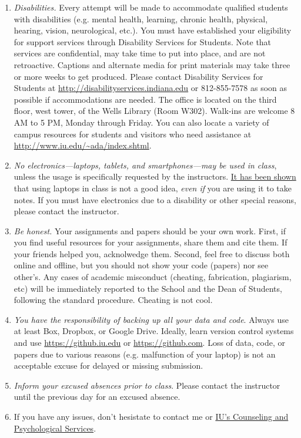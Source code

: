 \documentclass[11pt,article,oneside]{memoir}
\begin{document}
\begin{enumerate}

\item \emph{Disabilities.} Every attempt will be made to accommodate qualified
students with disabilities (e.g. mental health, learning, chronic health,
physical, hearing, vision, neurological, etc.). You must have established your
eligibility for support services through Disability Services for Students. Note
that services are confidential, may take time to put into place, and are not
retroactive.  Captions and alternate media for print materials may take three
or more weeks to get produced. Please contact Disability Services for Students
at \url{http://disabilityservices.indiana.edu} or 812-855-7578 as soon as
possible if accommodations are needed. The office is located on the third
floor, west tower, of the Wells Library (Room W302). Walk-ins are welcome 8 AM
to 5 PM, Monday through Friday. You can also locate a variety of campus
resources for students and visitors who need assistance at
\url{http://www.iu.edu/~ada/index.shtml}. 

\item \emph{No electronics---laptops, tablets, and smartphones---may be used in
class}, unless the usage is specifically requested by the instructors.
\href{http://www.scientificamerican.com/article/a-learning-secret-don-t-take-notes-with-a-laptop/}{It
has been shown} that using laptops in class is not a good idea, \emph{even if}
you are using it to take notes.  If you must have electronics due to a
disability or other special reasons, please contact the instructor. 

\item \emph{Be honest.} Your assignments and papers should be your own work.
First, if you find useful resources for your assignments, share them and cite
them. If your friends helped you, acknolwedge them. Second, feel free to
discuss both online and offline, but you should not show your code (papers) nor
see other's. Any cases of academic misconduct (cheating, fabrication,
plagiarism, etc) will be immediately reported to the School and the Dean of
Students, following the standard procedure. Cheating is not cool. 

\item \emph{You have the responsibility of backing up all your data and code}.
Always use at least Box, Dropbox, or Google Drive. Ideally, learn version
control systems and use \url{https://github.iu.edu} or
\url{https://github.com}. Loss of data, code, or papers due to various reasons
(e.g. malfunction of your laptop) is not an acceptable excuse for delayed or
missing submission. 

\item \emph{Inform your excused absences prior to class}. Please contact the
instructor until the previous day for an excused absence.  

\item If you have any issues, don't hesistate to contact me or
\href{http://healthcenter.indiana.edu/counseling/index.shtml}{IU's Counseling
and Psychological Services}. 


\end{enumerate}
\end{document}
